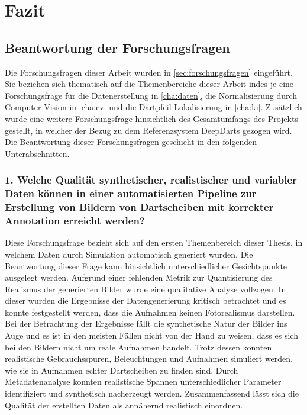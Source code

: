 
\chapter{Fazit}
\label{cha:fazit}


\section{Beantwortung der Forschungsfragen}
\label{sec:beantwortung_forschungsfragen}

Die Forschungsfragen dieser Arbeit wurden in \autoref{sec:forschungsfragen} eingeführt. Sie beziehen sich thematisch auf die Themenbereiche dieser Arbeit indes je eine Forschungsfrage für die Datenerstellung in \autoref{cha:daten}, die Normalisierung durch Computer Vision in \autoref{cha:cv} und die Dartpfeil-Lokalisierung in \autoref{cha:ki}. Zusätzlich wurde eine weitere Forschungsfrage hinsichtlich des Gesamtumfangs des Projekts gestellt, in welcher der Bezug zu dem Referenzsystem DeepDarts gezogen wird. Die Beantwortung dieser Forschungsfragen geschieht in den folgenden Unterabschnitten.

\subsection*{1. Welche Qualität synthetischer, realistischer und variabler Daten können in einer automatisierten Pipeline zur Erstellung von Bildern von Dartscheiben mit korrekter Annotation erreicht werden?}

Diese Forschungsfrage bezieht sich auf den ersten Themenbereich dieser Thesis, in welchem Daten durch Simulation automatisch generiert wurden. Die Beantwortung dieser Frage kann hinsichtlich unterschiedlicher Gesichtspunkte ausgelegt werden. Aufgrund einer fehlenden Metrik zur Quantisierung des Realismus der generierten Bilder wurde eine qualitative Analyse vollzogen. In dieser wurden die Ergebnisse der Datengenerierung kritisch betrachtet und es konnte festgestellt werden, dass die Aufnahmen keinen Fotorealismus darstellen. Bei der Betrachtung der Ergebnisse fällt die synthetische Natur der Bilder ins Auge und es ist in den meisten Fällen nicht von der Hand zu weisen, dass es sich bei den Bildern nicht um reale Aufnahmen handelt. Trotz dessen konnten realistische Gebrauchsspuren, Beleuchtungen und Aufnahmen simuliert werden, wie sie in Aufnahmen echter Dartscheiben zu finden sind. Durch Metadatenanalyse konnten realistische Spannen unterschiedlicher Parameter identifiziert und synthetisch nacherzeugt werden. Zusammenfassend lässt sich die Qualität der erstellten Daten als annähernd realistisch einordnen.

